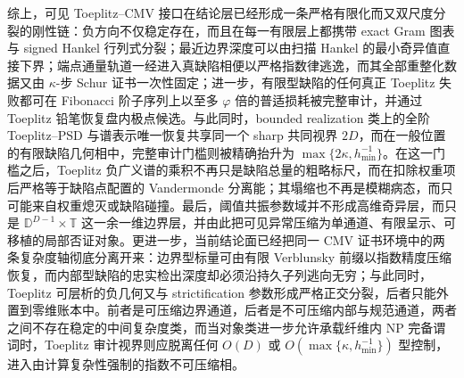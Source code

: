 



综上，可见 Toeplitz--CMV 接口在结论层已经形成一条严格有限化而又双尺度分裂的刚性链：负方向不仅稳定存在，而且在每一有限层上都携带 exact Gram 图表与 signed Hankel 行列式分裂；最近边界深度可以由扫描 Hankel 的最小奇异值直接下界；端点通量轨道一经进入真缺陷相便以严格指数律逃逸，而其全部重整化数据又由 \(\kappa\)-步 Schur 证书一次性固定；进一步，有限型缺陷的任何真正 Toeplitz 失败都可在 Fibonacci 阶子序列上以至多 \(\varphi\) 倍的普适损耗被完整审计，并通过 Toeplitz 铅笔恢复盘内极点候选。与此同时，bounded realization 类上的全阶 Toeplitz--PSD 与谱表示唯一恢复共享同一个 sharp 共同视界 \(2D\)，而在一般位置的有限缺陷几何相中，完整审计门槛则被精确抬升为 \(\max\{2\kappa,h_{\min}^{-1}\}\)。在这一门槛之后，Toeplitz 负广义谱的乘积不再只是缺陷总量的粗略标尺，而在扣除权重项后严格等于缺陷点配置的 Vandermonde 分离能；其塌缩也不再是模糊病态，而只可能来自权重熄灭或缺陷碰撞。最后，阈值共振参数域并不形成高维奇异层，而只是 \(\mathbb D^{D-1}\times\mathbb T\) 这一余一维边界层，并由此把可见异常压缩为单通道、有限呈示、可移植的局部否证对象。更进一步，当前结论面已经把同一 CMV 证书环境中的两条复杂度轴彻底分离开来：边界型标量可由有限 Verblunsky 前缀以指数精度压缩恢复，而内部型缺陷的忠实检出深度却必须沿持久子列逃向无穷；与此同时，Toeplitz 可层析的负几何又与 strictification 参数形成严格正交分裂，后者只能外置到零维账本中。前者是可压缩边界通道，后者是不可压缩内部与规范通道，两者之间不存在稳定的中间复杂度类，而当对象类进一步允许承载纤维内 NP 完备谓词时，Toeplitz 审计视界则应脱离任何 \(O(D)\) 或 \(O(\max\{\kappa,h_{\min}^{-1}\})\) 型控制，进入由计算复杂性强制的指数不可压缩相。

\endinput
